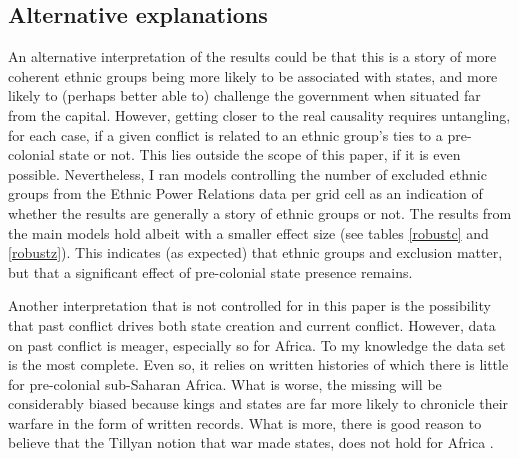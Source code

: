 \documentclass[12pt]{article}
\begin{document}


\subsection{Alternative explanations} \label{Alternative explanations}

An alternative interpretation of the results could be that this is a story of
more coherent ethnic groups being more likely to be associated with states, and
more likely to (perhaps better able to) challenge the government when situated
far from the capital. However, getting closer to the real causality requires
untangling, for each case, if a given conflict is related to an ethnic group's
ties to a pre-colonial state or not. This lies outside the scope of this paper,
if it is even possible. Nevertheless, I ran models controlling the number of
excluded ethnic groups from the Ethnic Power Relations data per grid cell
\citep{Vogt2015} as an indication of whether the results are generally a story of
ethnic groups or not. The results from the main models hold albeit with a smaller
effect size (see tables \ref{robustc} and \ref{robustz}). This indicates (as
expected) that ethnic groups and exclusion matter, but that a significant effect
of pre-colonial state presence remains.

Another interpretation that is not controlled for in this paper is the
possibility that past conflict drives both state creation and current conflict.
However, data on past conflict is meager, especially so for Africa. To my
knowledge the \citet{Brecke1999} data set is the most complete. Even so, it
relies on written histories of which there is little for pre-colonial
sub-Saharan Africa. What is worse, the missing will be considerably biased
because kings and states are far more likely to chronicle their warfare in the
form of written records. What is more, there is good reason to believe that the
Tillyan notion that war made states, does not hold for Africa
\citep{Dincecco_2019}. 
\end{document}
